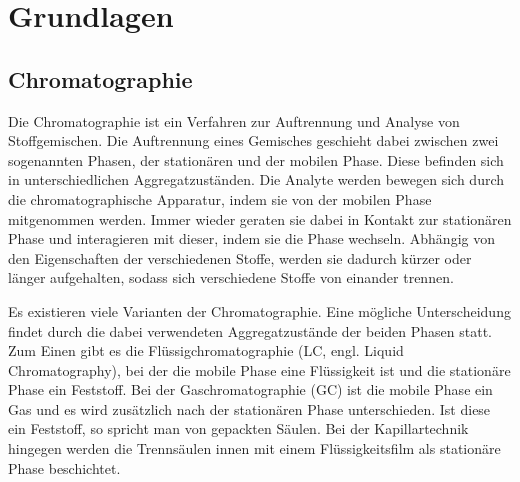 
\chapter{Grundlagen}
\label{chapter:gru}

\section{Chromatographie}

Die Chromatographie ist ein Verfahren zur Auftrennung und Analyse von Stoffgemischen. Die Auftrennung eines Gemisches geschieht dabei zwischen zwei sogenannten Phasen, der stationären und der mobilen Phase. Diese befinden sich in unterschiedlichen Aggregatzuständen. 
Die Analyte werden bewegen sich durch die chromatographische Apparatur, indem sie von der mobilen Phase mitgenommen werden. Immer wieder geraten sie dabei in Kontakt zur stationären Phase und interagieren mit dieser, indem sie die Phase wechseln. Abhängig von den Eigenschaften der verschiedenen Stoffe, werden sie dadurch kürzer oder länger aufgehalten, sodass sich verschiedene Stoffe von einander trennen.

Es existieren viele Varianten der Chromatographie. Eine mögliche Unterscheidung findet durch die dabei verwendeten Aggregatzustände der beiden Phasen statt. Zum Einen gibt es die Flüssigchromatographie (LC, engl. Liquid Chromatography),
bei der die mobile Phase eine Flüssigkeit ist und die stationäre Phase ein Feststoff. 
Bei der Gaschromatographie (GC) ist die mobile Phase ein Gas und es wird zusätzlich nach der stationären Phase unterschieden. Ist diese ein Feststoff, so spricht man von gepackten Säulen. Bei der Kapillartechnik hingegen werden die Trennsäulen innen mit einem Flüssigkeitsfilm als stationäre Phase beschichtet.



